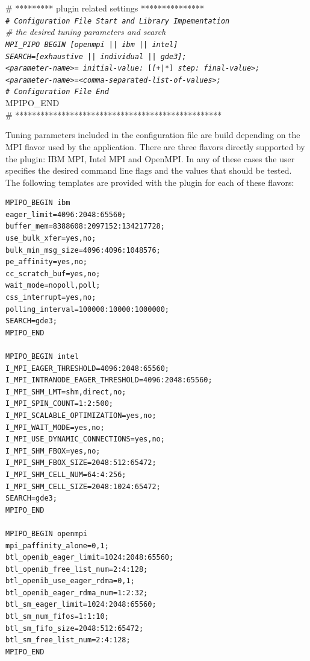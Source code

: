 \documentclass[11pt,a4paper, oneside]{book} %
\newenvironment{code}%
{
\addtolength{\leftskip}{0.5cm}}%
{

}
\begin{document}
\begin{code}
\# ********* plugin related settings *************** \\
	\texttt{\textit{\# Configuration File Start and Library Impementation}} \\
	\textit{\# the desired tuning parameters and search} \\
	\texttt{\textit{MPI\_PIPO BEGIN} \textit{[openmpi || ibm || intel]} }\\
	\texttt{\textit{SEARCH=[exhaustive ||  individual || gde3];}}\\
	\texttt{\textit{<parameter-name>= initial-value:} [\textit{[+|*}] 				 	\textit{step: final-value>;}}\\
	\texttt{\textit{<parameter-name>=<comma-separated-list-of-values>;}}\\
	\texttt{\textit{\# Configuration File End}}\\
	MPIPO\_END\\
\# *************************************************
\end{code}

Tuning parameters included in the configuration file are build depending on the MPI flavor used by the application. There are three flavors directly supported by the plugin: IBM MPI, Intel MPI and OpenMPI. In any of these cases the user specifies the desired command line flags and the values that should be tested. The following templates are provided with the plugin for each of these flavors:

\begin{verbatim}
MPIPO_BEGIN ibm
eager_limit=4096:2048:65560;
buffer_mem=8388608:2097152:134217728;
use_bulk_xfer=yes,no;
bulk_min_msg_size=4096:4096:1048576;
pe_affinity=yes,no;
cc_scratch_buf=yes,no;
wait_mode=nopoll,poll;
css_interrupt=yes,no;
polling_interval=100000:10000:1000000;
SEARCH=gde3;
MPIPO_END 

MPIPO_BEGIN intel
I_MPI_EAGER_THRESHOLD=4096:2048:65560;
I_MPI_INTRANODE_EAGER_THRESHOLD=4096:2048:65560;
I_MPI_SHM_LMT=shm,direct,no;
I_MPI_SPIN_COUNT=1:2:500;
I_MPI_SCALABLE_OPTIMIZATION=yes,no;
I_MPI_WAIT_MODE=yes,no;
I_MPI_USE_DYNAMIC_CONNECTIONS=yes,no;
I_MPI_SHM_FBOX=yes,no;
I_MPI_SHM_FBOX_SIZE=2048:512:65472;
I_MPI_SHM_CELL_NUM=64:4:256;
I_MPI_SHM_CELL_SIZE=2048:1024:65472;
SEARCH=gde3;
MPIPO_END

MPIPO_BEGIN openmpi
mpi_paffinity_alone=0,1;
btl_openib_eager_limit=1024:2048:65560; 
btl_openib_free_list_num=2:4:128;
btl_openib_use_eager_rdma=0,1;
btl_openib_eager_rdma_num=1:2:32;
btl_sm_eager_limit=1024:2048:65560; 
btl_sm_num_fifos=1:1:10;
btl_sm_fifo_size=2048:512:65472;
btl_sm_free_list_num=2:4:128;
MPIPO_END
\end{verbatim}
\end{document}
